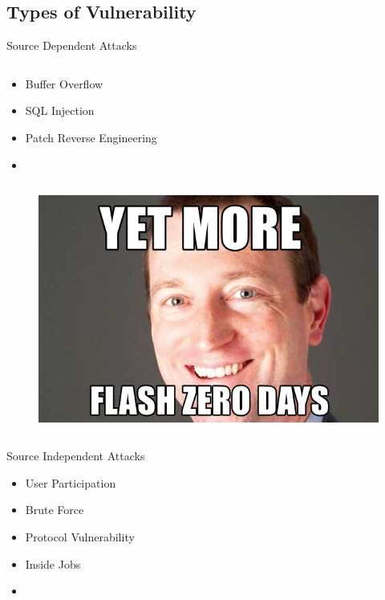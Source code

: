 \subsection{Types of Vulnerability}
\begin{frame}{Source Dependent Attacks}
  \begin{column}{0.45\textwidth}
    \begin{itemize}
      \item Buffer Overflow
      \item SQL Injection
      \item Patch Reverse Engineering
      \item\cite{clarke}
    \end{itemize}
  \end{column}
  \begin{column}{0.5\textwidth}\raggedleft{}
    \begin{figure}
      \includegraphics[width=\textwidth]{images/adobe.jpg}
    \end{figure}
  \end{column}
\end{frame}

\begin{frame}{Source Independent Attacks}
  \begin{itemize}
    \item User Participation
    \item Brute Force
    \item Protocol Vulnerability
    \item Inside Jobs
    \item\cite{clarke}
  \end{itemize}
\end{frame}
